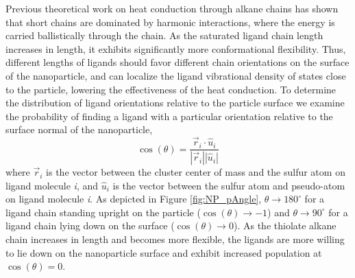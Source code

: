 \documentclass[aps,jcp,preprint,showpacs,superscriptaddress,groupedaddress]{revtex4-1}  %
\begin{document}
Previous theoretical work on heat conduction through alkane chains has
shown that short chains are dominated by harmonic interactions, where
the energy is carried ballistically through the
chain.\cite{Segal:2003qy} As the saturated ligand chain length
increases in length, it exhibits significantly more conformational
flexibility. Thus, different lengths of ligands should favor different
chain orientations on the surface of the nanoparticle, and can
localize the ligand vibrational density of states close to the
particle, lowering the effectiveness of the heat
conduction.\cite{Segal:2003qy} To determine the distribution of ligand
orientations relative to the particle surface we examine the
probability of finding a ligand with a particular orientation relative
to the surface normal of the nanoparticle,
\begin{equation} 
\cos{(\theta)}=\frac{\vec{r}_i\cdot\hat{u}_i}{|\vec{r}_i||\hat{u}_i|}
\end{equation}
where $\vec{r}_{i}$ is the vector between the cluster center of mass
and the sulfur atom on ligand molecule {\it i}, and $\hat{u}_{i}$ is
the  vector between the sulfur atom and  pseudo-atom on ligand
molecule {\it i}. As depicted in Figure \ref{fig:NP_pAngle}, $\theta
\rightarrow 180^{\circ}$ for a ligand chain standing upright on the
particle ($\cos{(\theta)} \rightarrow -1$) and $\theta \rightarrow
90^{\circ}$ for a ligand chain lying down on the surface
($\cos{(\theta)} \rightarrow 0$). As the thiolate alkane chain
increases in length and becomes more flexible, the ligands are more
willing to lie down on the nanoparticle surface and exhibit increased
population at $\cos{(\theta)} = 0$.
\end{document}
